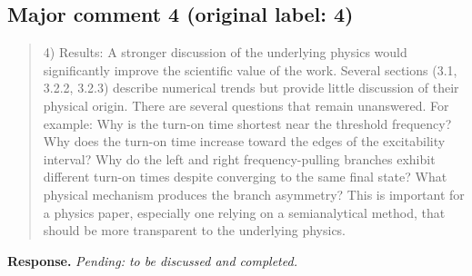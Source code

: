 \documentclass[11pt,a4paper]{article}
\newcommand{\reviewercomment}[1]{\begin{quote}\small #1\end{quote}}
\newcommand{\response}[1]{\par\textbf{Response.} #1\par}
\newcommand{\pendingresponse}{\response{\textit{Pending: to be discussed and completed.}}}
\begin{document}
\subsection*{Major comment 4 (original label: 4)}
\label{r1-major-4}
\reviewercomment{
4) Results: A stronger discussion of the underlying physics would significantly improve the scientific value of the work. Several sections (3.1, 3.2.2, 3.2.3) describe numerical trends but provide little discussion of their physical origin. There are several questions that remain unanswered. For example: Why is the turn-on time shortest near the threshold frequency? Why does the turn-on time increase toward the edges of the excitability interval? Why do the left and right frequency-pulling branches exhibit different turn-on times despite converging to the same final state? What physical mechanism produces the branch asymmetry? This is important for a physics paper, especially one relying on a semianalytical method, that should be more transparent to the underlying physics.
}
\pendingresponse
\end{document}
